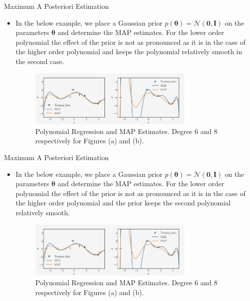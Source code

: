 \documentclass{beamer}
\begin{document}
\begin{frame}{Maximum A Posteriori Estimation}
\begin{itemize}[<+->]
    \item In the below example, we place a Gaussian prior $p(\boldsymbol{\theta}) = \mathcal{N}(\boldsymbol{0}, \boldsymbol{I})$ on the parameters $\boldsymbol{\theta}$ and determine the MAP estimates. For the lower order polynomial the effect of the prior is not as pronounced as it is in the case of the higher order polynomial and keeps the polynomial relatively smooth in the second case.

    \begin{figure}[htp]
    \centering
    \includegraphics[width=8cm]{figures/map.png}
    \caption{Polynomial Regression and MAP Estimates. Degree 6 and 8 respectively for Figures (a) and (b).}
    \label{fig:map}
    \end{figure}

\end{itemize}
\end{frame}
\begin{frame}{Maximum A Posteriori Estimation}
\begin{itemize}[<+->]
    \item In the below example, we place a Gaussian prior $p(\boldsymbol{\theta}) = \mathcal{N}(\boldsymbol{0}, \boldsymbol{I})$ on the parameters $\boldsymbol{\theta}$ and determine the MAP estimates. For the lower order polynomial the effect of the prior is not as pronounced as it is in the case of the higher order polynomial and the prior keeps the second polynomial relatively smooth.

    \begin{figure}[htp]
    \centering
    \includegraphics[width=8cm]{figures/map.png}
    \caption{Polynomial Regression and MAP Estimates. Degree 6 and 8 respectively for Figures (a) and (b).}
    \label{fig:map}
    \end{figure}

\end{itemize}
\end{frame}
\end{document}
